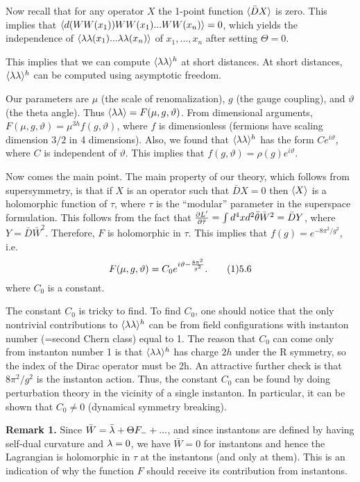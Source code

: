 Now recall that for any operator $X$ the 1-point function 
$\langle\bar D X\rangle$ is zero. This implies that 
$\langle d(WW(x_1))WW(x_1)...WW(x_n)\rangle=0$, which yields the independence 
of $\langle\lambda\lambda(x_1)...\lambda\lambda(x_n)\rangle$ of $x_1,...,x_n$ after setting $\Theta=0$. 

This implies that we can compute 
$\langle\lambda\lambda\rangle^h$ at short distances. At short distances, 
$\langle\lambda\lambda\rangle^h$ can be computed using asymptotic freedom. 

Our parameters are $\mu$ (the scale of renomalization), $g$ 
(the gauge coupling), and $\vartheta$ (the theta angle). 
Thus $\langle\lambda\lambda\rangle=F(\mu,g,\vartheta)$. From dimensional
arguments, $F(\mu,g,\vartheta)=\mu^{3h}f(g,\vartheta)$, where $f$ is dimensionless
(fermions have scaling dimension $3/2$ in 4 dimensions). 
Also, we found that $\langle\lambda\lambda\rangle^h$ has the form $Ce^{i\vartheta}$, where 
$C$ is independent of $\vartheta$. This implies 
that $f(g,\vartheta)=\rho(g)e^{i\vartheta}$. 

Now comes the main point. The main property of our theory, which follows 
from supersymmetry, is that if $X$ is an operator such that
$\bar D X=0$ then $\langle X\rangle$ is a holomorphic function of $\tau$, where 
$\tau$ is the ``modular'' parameter in the superspace formulation. 
This follows from the fact that $\frac{\partial L'}{\partial\bar\tau}=
\int d^4xd^2\bar\theta \bar W^2=\bar D Y$, 
where $Y=\bar D\bar W^2$. Therefore, $F$ is holomorphic in $\tau$. 
This implies that $f(g)=e^{-8\pi^2/g^2}$, i.e. 
$$
F(\mu,g,\vartheta)=C_0e^{i\vartheta-\frac{8\pi^2}{g^2}}.\tag 15.6
$$
where $C_0$ is a constant. 

The constant $C_0$ is tricky to find. 
To find $C_0$, one should notice 
that the only nontrivial 
contributions to $\langle\lambda\lambda\rangle^h$ can be from field configurations with 
instanton number (=second Chern class) equal to 1.
The reason that $C_0$ can come only from instanton
number 1 is that $\langle\lambda\lambda\rangle^h$ has charge $2h$ under the R symmetry,
so the index of the Dirac operator must be 2h. 
 An attractive further check is that $8\pi^2/g^2$ is the
instanton action.
Thus, the constant $C_0$ can be found by doing perturbation theory 
in the vicinity of a single instanton. In particular, it can be shown 
that $C_0\ne 0$ (dynamical symmetry breaking). 

{\bf Remark 1.}  Since $\bar W=\bar{\lambda}+\Theta F_-+...$, 
and since instantons are defined by having 
self-dual curvature and $\lambda=0$, we have 
$\bar W=0$ for instantons and hence the Lagrangian is holomorphic in $\tau$ 
at the instantons (and only at them). This is an indication
of why the function $F$ should receive its contribution from instantons.

